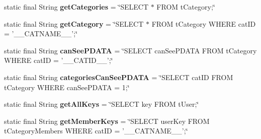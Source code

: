 \begin{DoxyCompactItemize}
\item 
\hypertarget{classballmerpeak_1_1turtlenet_1_1server_1_1DBStrings_abe38c9de113b63c18b1e7083e8b1af6f}{static final String {\bfseries get\-Categories} = \char`\"{}S\-E\-L\-E\-C\-T $\ast$ F\-R\-O\-M t\-Category;\char`\"{}}\label{classballmerpeak_1_1turtlenet_1_1server_1_1DBStrings_abe38c9de113b63c18b1e7083e8b1af6f}

\item 
\hypertarget{classballmerpeak_1_1turtlenet_1_1server_1_1DBStrings_aefd36226bfa1c2c3f5b7cfd7a88c8ea6}{static final String {\bfseries get\-Category} = \char`\"{}S\-E\-L\-E\-C\-T $\ast$ F\-R\-O\-M t\-Category W\-H\-E\-R\-E cat\-I\-D = '\-\_\-\-\_\-\-C\-A\-T\-N\-A\-M\-E\-\_\-\-\_\-';\char`\"{}}\label{classballmerpeak_1_1turtlenet_1_1server_1_1DBStrings_aefd36226bfa1c2c3f5b7cfd7a88c8ea6}

\item 
\hypertarget{classballmerpeak_1_1turtlenet_1_1server_1_1DBStrings_a77d2491681df92cdf133252afe8af98d}{static final String {\bfseries can\-See\-P\-D\-A\-T\-A} = \char`\"{}S\-E\-L\-E\-C\-T can\-See\-P\-D\-A\-T\-A F\-R\-O\-M t\-Category W\-H\-E\-R\-E cat\-I\-D = '\-\_\-\-\_\-\-C\-A\-T\-I\-D\-\_\-\-\_\-';\char`\"{}}\label{classballmerpeak_1_1turtlenet_1_1server_1_1DBStrings_a77d2491681df92cdf133252afe8af98d}

\item 
\hypertarget{classballmerpeak_1_1turtlenet_1_1server_1_1DBStrings_af323bc7e8a4dfe7f7f321a0f868b234b}{static final String {\bfseries categories\-Can\-See\-P\-D\-A\-T\-A} = \char`\"{}S\-E\-L\-E\-C\-T cat\-I\-D F\-R\-O\-M t\-Category W\-H\-E\-R\-E can\-See\-P\-D\-A\-T\-A = 1;\char`\"{}}\label{classballmerpeak_1_1turtlenet_1_1server_1_1DBStrings_af323bc7e8a4dfe7f7f321a0f868b234b}

\item 
\hypertarget{classballmerpeak_1_1turtlenet_1_1server_1_1DBStrings_a421524524ae9aecc5f05c4a087a8a3b9}{static final String {\bfseries get\-All\-Keys} = \char`\"{}S\-E\-L\-E\-C\-T key F\-R\-O\-M t\-User;\char`\"{}}\label{classballmerpeak_1_1turtlenet_1_1server_1_1DBStrings_a421524524ae9aecc5f05c4a087a8a3b9}

\item 
\hypertarget{classballmerpeak_1_1turtlenet_1_1server_1_1DBStrings_af52ab80c3167b21dd0b8c7c61e498e61}{static final String {\bfseries get\-Member\-Keys} = \char`\"{}S\-E\-L\-E\-C\-T user\-Key F\-R\-O\-M t\-Category\-Members W\-H\-E\-R\-E cat\-I\-D = '\-\_\-\-\_\-\-C\-A\-T\-N\-A\-M\-E\-\_\-\-\_\-';\char`\"{}}\label{classballmerpeak_1_1turtlenet_1_1server_1_1DBStrings_af52ab80c3167b21dd0b8c7c61e498e61}


\end{DoxyCompactItemize}
